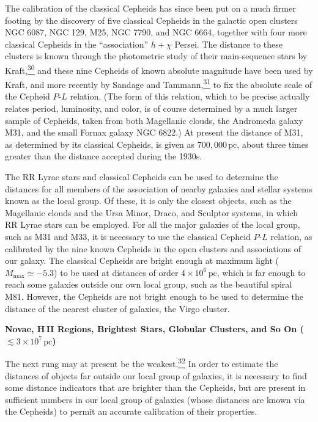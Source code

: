 The calibration of the classical Cepheids has since been put on a much
firmer footing by the discovery of five classical Cepheids in the galactic
open clusters NGC 6087, NGC 129, M25, NGC 7790, and NGC 6664, together with
four more classical Cepheids in the ``association'' \(h+\chi\) Persei. The
distance to these clusters is known through the photometric study of their
main-sequence stars by Kraft,\hyperref[ch14-ref-30]{\textsuperscript{30}}
and these nine Cepheids of known absolute magnitude have been used by Kraft,
and more recently by Sandage and
Tammann,\hyperref[ch14-ref-31]{\textsuperscript{31}} to fix the absolute
scale of the Cepheid \(P\)-\(L\) relation. (The form of this relation, which
to be precise actually relates period, luminosity, and color, is of course
determined by a much larger sample of Cepheids, taken from both Magellanic
clouds, the Andromeda galaxy M31, and the small Fornax galaxy NGC 6822.) At
present the distance of M31, as determined by its classical Cepheids, is
given as \(700{,}000\,\mathrm{pc}\), about three times greater than the
distance accepted during the 1930s.

The RR Lyrae stars and classical Cepheids can be used to determine the
distances for all members of the association of nearby galaxies and stellar
systems known as the local group. Of these, it is only the closest objects,
such as the Magellanic clouds and the Ursa Minor, Draco, and Sculptor
systems, in which RR Lyrae stars can be employed. For all the major galaxies
of the local group, such as M31 and M33, it is necessary to use the classical
Cepheid \(P\)-\(L\) relation, as calibrated by the nine known Cepheids in the
open clusters and associations of our galaxy. The classical Cepheids are
bright enough at maximum light (\(M_{\max}\simeq-5.3\)) to be used at
distances of order \(4\times10^6\,\mathrm{pc}\), which is far enough to
reach some galaxies outside our own local group, such as the beautiful
spiral M81. However, the Cepheids are not bright enough to be used to
determine the distance of the nearest cluster of galaxies, the Virgo
cluster.

\medskip
\noindent\textbf{Novae, H\,II Regions, Brightest Stars, Globular Clusters,
and So On (\(\lesssim3\times10^7\,\mathrm{pc}\))}
\par\smallskip

The next rung may at present be the
weakest.\hyperref[ch14-ref-32]{\textsuperscript{32}} In order to estimate the
distances of objects far outside our local group of galaxies, it is
necessary to find some distance indicators that are brighter than the
Cepheids, but are present in sufficient numbers in our local group of
galaxies (whose distances are known via the Cepheids) to permit an accurate
calibration of their properties.

